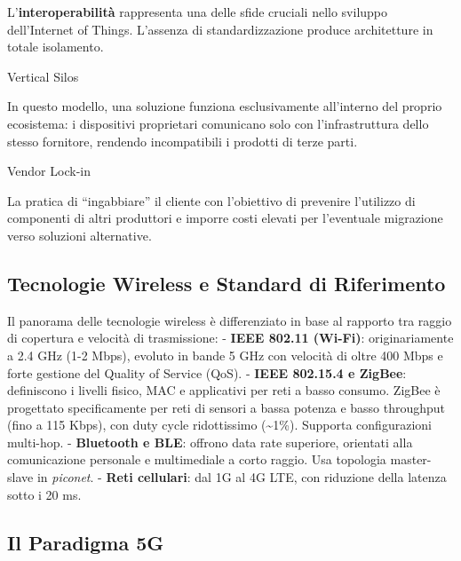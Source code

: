 \documentclass[
  italian,
  openany]{book}
\begin{document}
L'\textbf{interoperabilità} rappresenta una delle sfide cruciali nello
sviluppo dell'Internet of Things. L'assenza di standardizzazione produce
architetture in totale isolamento.

\begin{calloutdefinition}{Vertical Silos}

In questo modello, una soluzione funziona esclusivamente all'interno del
proprio ecosistema: i dispositivi proprietari comunicano solo con
l'infrastruttura dello stesso fornitore, rendendo incompatibili i
prodotti di terze parti.

\end{calloutdefinition}

\begin{calloutdefinition}{Vendor Lock-in}

La pratica di ``ingabbiare'' il cliente con l'obiettivo di prevenire
l'utilizzo di componenti di altri produttori e imporre costi elevati per
l'eventuale migrazione verso soluzioni alternative.

\end{calloutdefinition}

\subsection{Tecnologie Wireless e Standard di
Riferimento}\label{tecnologie-wireless-e-standard-di-riferimento}

Il panorama delle tecnologie wireless è differenziato in base al
rapporto tra raggio di copertura e velocità di trasmissione: -
\textbf{IEEE 802.11 (Wi-Fi)}: originariamente a 2.4 GHz (1-2 Mbps),
evoluto in bande 5 GHz con velocità di oltre 400 Mbps e forte gestione
del Quality of Service (QoS). - \textbf{IEEE 802.15.4 e ZigBee}:
definiscono i livelli fisico, MAC e applicativi per reti a basso
consumo. ZigBee è progettato specificamente per reti di sensori a bassa
potenza e basso throughput (fino a 115 Kbps), con duty cycle
ridottissimo (\textasciitilde1\%). Supporta configurazioni multi-hop. -
\textbf{Bluetooth e BLE}: offrono data rate superiore, orientati alla
comunicazione personale e multimediale a corto raggio. Usa topologia
master-slave in \emph{piconet}. - \textbf{Reti cellulari}: dal 1G al 4G
LTE, con riduzione della latenza sotto i 20 ms.

\subsection{Il Paradigma 5G}\label{il-paradigma-5g}
\end{document}
